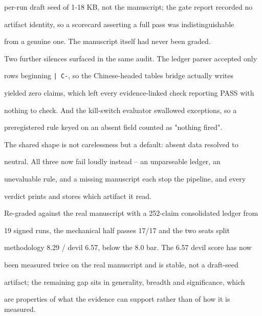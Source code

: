 \documentclass[11pt]{article}
\begin{document}
per-run draft seed of 1-18 KB, not the manuscript; the gate report recorded no

artifact identity, so a scorecard asserting a full pass was indistinguishable

from a genuine one. The manuscript itself had never been graded.


Two further silences surfaced in the same audit. The ledger parser accepted only

rows beginning \texttt{| C-}, so the Chinese-headed tables bridge actually writes

yielded zero claims, which left every evidence-linked check reporting PASS with

nothing to check. And the kill-switch evaluator swallowed exceptions, so a

preregistered rule keyed on an absent field counted as "nothing fired".


The shared shape is not carelessness but a default: absent data resolved to

neutral. All three now fail loudly instead -- an unparseable ledger, an

unevaluable rule, and a missing manuscript each stop the pipeline, and every

verdict prints and stores which artifact it read.


Re-graded against the real manuscript with a 252-claim consolidated ledger from

19 signed runs, the mechanical half passes 17/17 and the two seats split

methodology 8.29 / devil 6.57, below the 8.0 bar. The 6.57 devil score has now

been measured twice on the real manuscript and is stable, not a draft-seed

artifact; the remaining gap sits in generality, breadth and significance, which

are properties of what the evidence can support rather than of how it is measured.
\end{document}
